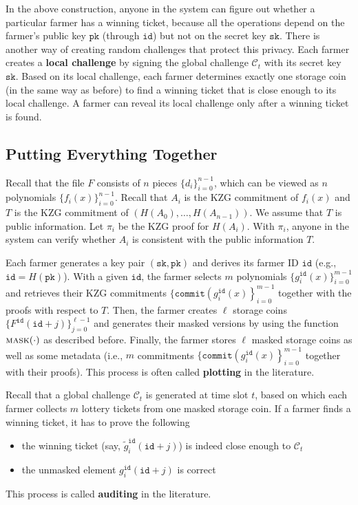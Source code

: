 \documentclass[12pt,draftcls,onecolumn]{IEEEtran}
\newcommand{\sk}{\texttt{sk}}
\newcommand{\pk}{\texttt{pk}}
\newcommand{\id}{\texttt{id}}
\newcommand{\cmt}{\texttt{commit}}
\newcommand{\mask}{\textsc{mask}}
\begin{document}
In the above construction, anyone in the system can figure out whether a particular farmer has a winning ticket, because all the operations depend on the farmer's public key $\pk$ (through $\id$) but not on the secret key $\sk$.  
There is another way of creating random challenges that protect this privacy. 
Each farmer creates a {\bf local challenge} by signing the global challenge $\mathcal{C}_t$ with its secret key $\sk$. Based on its local challenge, each farmer determines exactly one storage coin (in the same way as before) to find a winning ticket that is close enough to its local challenge. A farmer can reveal its local challenge only after a winning ticket is found.

\subsection{Putting Everything Together}

Recall that the file $F$ consists of $n$ pieces $\{d_i\}_{i = 0}^{n-1}$, which can be viewed as $n$ polynomials $\{ f_i(x) \}_{i = 0}^{n-1}$. Recall that
$A_i$ is the KZG commitment of $f_i(x)$ and $T$ is the KZG commitment of $(H(A_0), \ldots, H(A_{n-1}))$. We assume that $T$ is public information.
Let $\pi_i$ be the KZG proof for $H(A_i)$. With $\pi_i$, anyone in the system can verify whether $A_i$ is consistent with the public information $T$.

Each farmer generates a key pair $(\sk, \pk)$ and derives its farmer ID $\id$ (e.g., $\id = H(\pk)$).
With a given $\id$, the farmer selects $m$ polynomials $\{g_i^{\id}(x) \}_{i = 0}^{m - 1}$ and retrieves their KZG commitments $\{\cmt\left(g_i^{\id}(x) \right \}_{i = 0}^{m - 1}$
together with the proofs with respect to $T$. Then, the farmer creates $\ell$ storage coins 
$\{ F^{\id}(\id + j) \}_{j = 0}^{\ell - 1}$ and generates their masked versions by using the function $\mask(\cdot)$ as described before.
Finally, the farmer stores $\ell$ masked storage coins as well as some metadata (i.e., $m$ commitments $\{\cmt\left(g_i^{\id}(x) \right \}_{i = 0}^{m - 1}$ together with their proofs).
This process is often called {\bf plotting} in the literature.

Recall that a global challenge $\mathcal{C}_t$ is generated at time slot $t$, based on which each farmer collects $m$ lottery tickets from one masked storage coin. If a farmer finds a winning ticket, it has to prove the following
\begin{itemize}
    \item the winning ticket (say, $\tilde{g}_i^{\id}(\id + j)$) is indeed close enough to $\mathcal{C}_t$
    \item the unmasked element ${g}_i^{\id}(\id + j)$ is correct
\end{itemize}
This process is called {\bf auditing} in the literature. 
\end{document}
